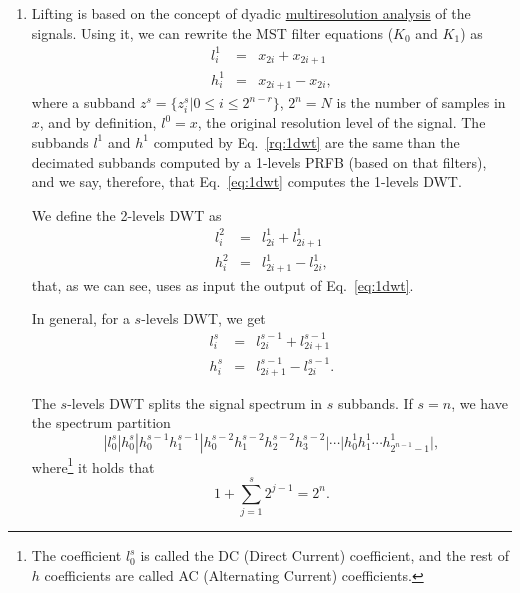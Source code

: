 \begin{enumerate}
\item Lifting is based on the concept of dyadic
  \href{https://en.wikipedia.org/wiki/Multiresolution_analysis}{multiresolution
    analysis} of the signals. Using it, we can rewrite the MST filter
  equations ($K_0$ and $K_1$) as
  \begin{equation}
    \begin{array}{rcl}
      l^1_i & = & x_{2i} + x_{2i+1} \\
      h^1_i & = & x_{2i+1} - x_{2i},
    \end{array}
    \label{eq:1dwt}
  \end{equation}
  where a subband $z^s=\{z_i^s|0\le i\le 2^{n-r}\}$, $2^n=N$ is the
  number of samples in $x$, and by definition, $l^0=x$, the original
  resolution level of the signal. The subbands $l^1$ and $h^1$
  computed by Eq.~\ref{rq:1dwt} are the same than the decimated
  subbands computed by a 1-levels PRFB (based on that filters), and we
  say, therefore, that Eq.~\ref{eq:1dwt} computes the 1-levels DWT.

  We define the 2-levels DWT as
  \begin{equation}
    \begin{array}{rcl}
      l^2_i & = & l^1_{2i} + l^1_{2i+1} \\
      h^2_i & = & l^1_{2i+1} - l^1_{2i},
    \end{array}
    \label{eq:2dwt}
  \end{equation}
  that, as we can see, uses as input the output of Eq.~\ref{eq:1dwt}.

  In general, for a $s$-levels DWT, we get
    \begin{equation}
    \begin{array}{rcl}
      l^s_i & = & l^{s-1}_{2i} + l^{s-1}_{2i+1} \\
      h^s_i & = & l^{s-1}_{2i+1} - l^{s-1}_{2i}.
    \end{array}
    \label{eq:2dwt}
  \end{equation}

  The $s$-levels DWT splits the signal spectrum in $s$ subbands. If
  $s=n$, we have the spectrum partition
  \begin{equation*}
    | l^s_0 | h^s_0 | h^{s-1}_0 h^{s-1}_1 | h^{s-2}_0 h^{s-2}_1 h^{s-2}_2 h^{s-2}_3 | \cdots | h^1_0 h^1_1 \cdots h^1_{2^{n-1}-1} |,
  \end{equation*}
  where\footnote{The coefficient $l^s_0$ is called the DC (Direct
    Current) coefficient, and the rest of $h$ coefficients are called
    AC (Alternating Current) coefficients.} it holds that
  \begin{equation}
    1+\sum_{j=1}^s 2^{j-1}=2^n.
  \end{equation}


\end{enumerate}
